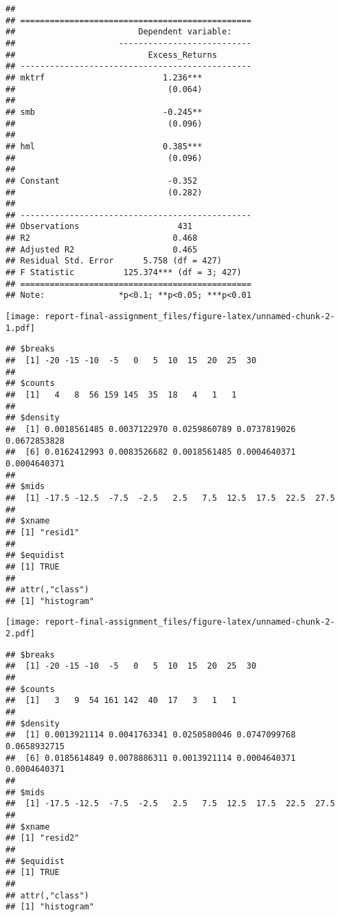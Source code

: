 \documentclass[
]{article}
\begin{document}
\begin{verbatim}
## 
## ===============================================
##                         Dependent variable:    
##                     ---------------------------
##                           Excess_Returns       
## -----------------------------------------------
## mktrf                        1.236***          
##                               (0.064)          
##                                                
## smb                          -0.245**          
##                               (0.096)          
##                                                
## hml                          0.385***          
##                               (0.096)          
##                                                
## Constant                      -0.352           
##                               (0.282)          
##                                                
## -----------------------------------------------
## Observations                    431            
## R2                             0.468           
## Adjusted R2                    0.465           
## Residual Std. Error      5.758 (df = 427)      
## F Statistic          125.374*** (df = 3; 427)  
## ===============================================
## Note:               *p<0.1; **p<0.05; ***p<0.01
\end{verbatim}

\texttt{[image: report-final-assignment\_files/figure-latex/unnamed-chunk-2-1.pdf]}

\begin{verbatim}
## $breaks
##  [1] -20 -15 -10  -5   0   5  10  15  20  25  30
## 
## $counts
##  [1]   4   8  56 159 145  35  18   4   1   1
## 
## $density
##  [1] 0.0018561485 0.0037122970 0.0259860789 0.0737819026 0.0672853828
##  [6] 0.0162412993 0.0083526682 0.0018561485 0.0004640371 0.0004640371
## 
## $mids
##  [1] -17.5 -12.5  -7.5  -2.5   2.5   7.5  12.5  17.5  22.5  27.5
## 
## $xname
## [1] "resid1"
## 
## $equidist
## [1] TRUE
## 
## attr(,"class")
## [1] "histogram"
\end{verbatim}

\texttt{[image: report-final-assignment\_files/figure-latex/unnamed-chunk-2-2.pdf]}

\begin{verbatim}
## $breaks
##  [1] -20 -15 -10  -5   0   5  10  15  20  25  30
## 
## $counts
##  [1]   3   9  54 161 142  40  17   3   1   1
## 
## $density
##  [1] 0.0013921114 0.0041763341 0.0250580046 0.0747099768 0.0658932715
##  [6] 0.0185614849 0.0078886311 0.0013921114 0.0004640371 0.0004640371
## 
## $mids
##  [1] -17.5 -12.5  -7.5  -2.5   2.5   7.5  12.5  17.5  22.5  27.5
## 
## $xname
## [1] "resid2"
## 
## $equidist
## [1] TRUE
## 
## attr(,"class")
## [1] "histogram"
\end{verbatim}
\end{document}
